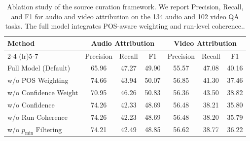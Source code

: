 \begin{table}[h]
\centering
\tablesize
\caption{
Ablation study of the source curation framework. 
We report Precision, Recall, and F1 for audio and video attribution on the 134 audio and 102 video QA tasks.
The full model integrates POS-aware weighting and run-level coherence..
}
\label{tab:ablation_filtering_audio_video}
\skiptablebegin
\setlength{\tabcolsep}{4pt}
\begin{tabular}{l|ccc|ccc}
\toprule
\multirow{2}{*}{\textbf{Method}} 
& \multicolumn{3}{c|}{\textbf{Audio Attribution}} 
& \multicolumn{3}{c}{\textbf{Video Attribution}} \\
\cmidrule(lr){2-4} \cmidrule(lr){5-7}
& Precision & Recall & F1 
& Precision & Recall & F1 \\
\midrule
Full Model (Default) & 65.96 & 47.27 & 49.90 & 55.57 & 47.08 & 40.16 \\
\midrule
w/o POS Weighting & 74.66 & 43.94 & 50.07 & 56.85 & 41.30 & 37.46 \\
w/o Confidence Weight & 70.95 & 46.26 & 50.83 & 56.36 & 43.50 & 38.82 \\
w/o Confidence      & 74.26 & 42.33 & 48.69 & 56.48 & 38.21 & 35.80 \\
w/o Run Coherence & 74.26 & 42.23 & 48.69 & 56.48 & 38.20 & 35.79 \\
w/o $p_{\min}$ Filtering & 74.21 & 42.49 & 48.85 & 56.62 & 38.77 & 36.22 \\
\bottomrule
\end{tabular}
\skiptableend
\end{table}
